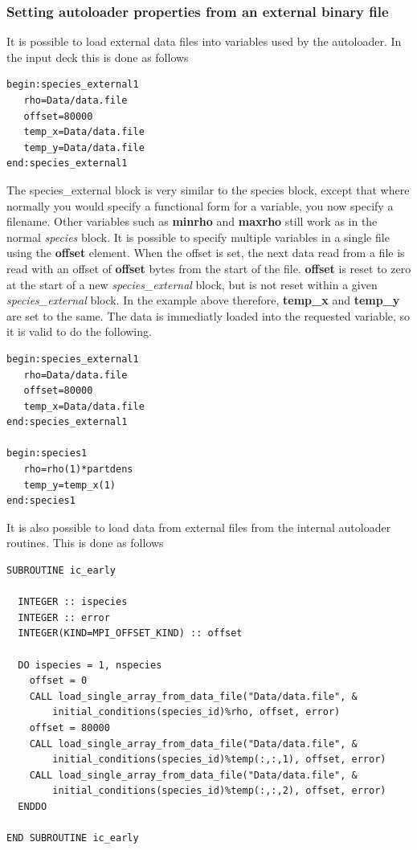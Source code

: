 \documentclass[12pt,a4paper]{article}
\newcommand{\simpleboxverbatim}{\begin{Verbatim}[obeytabs=true,frame=single,
  framerule=0.5mm,rulecolor=\color{warwickmid},formatcom=\color{black}]}
\begin{document}
\subsubsection{Setting autoloader properties from an external binary file}
It is possible to load external data files into variables used by the
autoloader. In the input deck this is done as follows
\simpleboxverbatim
begin:species_external1
   rho=Data/data.file
   offset=80000
   temp_x=Data/data.file
   temp_y=Data/data.file
end:species_external1
\end{Verbatim}

The species\_external block is very similar to the species block, except that
where normally you would specify a functional form for a variable, you now
specify a filename. Other variables such as {\bf minrho} and {\bf maxrho}
still work as in the normal {\it species} block. It is possible to specify
multiple variables in a single file using the {\bf offset} element. When the
offset is set, the next data read from a file is read with an offset of {\bf
offset} bytes from the start of the file. {\bf offset} is reset to zero at the
start of a new {\it species\_external} block, but is not reset within a given
{\it species\_external} block. In the example above therefore, {\bf temp\_x}
and {\bf temp\_y} are set to the same. The data is immediatly loaded into the
requested variable, so it is valid to do the following.
\simpleboxverbatim
begin:species_external1
   rho=Data/data.file
   offset=80000
   temp_x=Data/data.file
end:species_external1

begin:species1
   rho=rho(1)*partdens
   temp_y=temp_x(1)
end:species1
\end{Verbatim}
It is also possible to load data from external files from the internal
autoloader routines. This is done as follows

\simpleboxverbatim
SUBROUTINE ic_early

  INTEGER :: ispecies
  INTEGER :: error
  INTEGER(KIND=MPI_OFFSET_KIND) :: offset

  DO ispecies = 1, nspecies
    offset = 0
    CALL load_single_array_from_data_file("Data/data.file", &
        initial_conditions(species_id)%
    offset = 80000
    CALL load_single_array_from_data_file("Data/data.file", &
        initial_conditions(species_id)%
    CALL load_single_array_from_data_file("Data/data.file", &
        initial_conditions(species_id)%
  ENDDO

END SUBROUTINE ic_early
\end{Verbatim}
\end{document}
